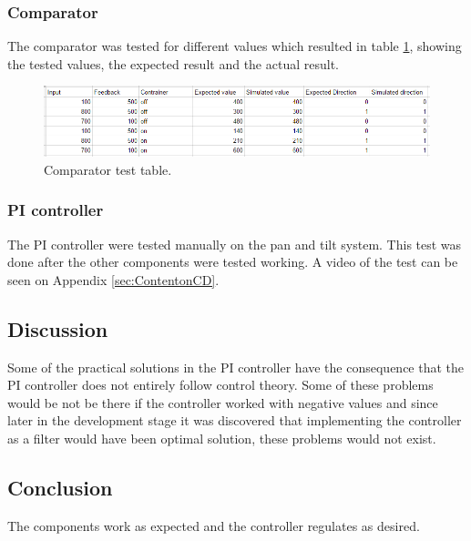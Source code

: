 \subsubsection{Comparator}

The comparator was tested for different values which resulted in table \ref{fig:Comparator_test_table}, showing the tested values, the expected result and the actual result.


\begin{figure}[h!]
\centering
\includegraphics[scale=0.8]{Billeder/FPGA/Comparator_test_table.png}
\caption{Comparator test table.}
\label{fig:Comparator_test_table}
\end{figure}


\subsubsection{PI controller}

The PI controller were tested manually on the pan and tilt system. This test was done after the other components were tested working. A video of the test can be seen on Appendix \ref{sec:ContentonCD}.

\subsection{Discussion}

Some of the practical solutions in the PI controller have the consequence that the PI controller does not entirely follow control theory. Some of these problems would be not be there if the controller worked with negative values and since later in the development stage it was discovered that implementing the controller as a filter would have been optimal solution, these problems would not exist.


\subsection{Conclusion}

The components work as expected and the controller regulates as desired.